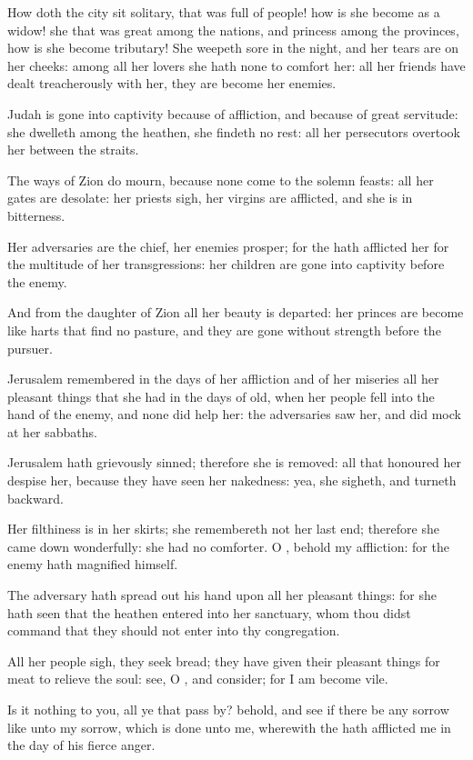 \Chapter
\Verse How doth the city sit solitary, that was full of people! how is she become as a widow! she that was great among the nations, and princess among the provinces, how is she become tributary!  \Verse She weepeth sore in the night, and her tears are on her cheeks: among all her lovers she hath none to comfort her: all her friends have dealt treacherously with her, they are become her enemies.

\Verse Judah is gone into captivity because of affliction, and because of great servitude: she dwelleth among the heathen, she findeth no rest: all her persecutors overtook her between the straits.

\Verse The ways of Zion do mourn, because none come to the solemn feasts: all her gates are desolate: her priests sigh, her virgins are afflicted, and she is in bitterness.

\Verse Her adversaries are the chief, her enemies prosper; for the \LORD hath afflicted her for the multitude of her transgressions: her children are gone into captivity before the enemy.

\Verse And from the daughter of Zion all her beauty is departed: her princes are become like harts that find no pasture, and they are gone without strength before the pursuer.

\Verse Jerusalem remembered in the days of her affliction and of her miseries all her pleasant things that she had in the days of old, when her people fell into the hand of the enemy, and none did help her: the adversaries saw her, and did mock at her sabbaths.

\Verse Jerusalem hath grievously sinned; therefore she is removed: all that honoured her despise her, because they have seen her nakedness: yea, she sigheth, and turneth backward.

\Verse Her filthiness is in her skirts; she remembereth not her last end; therefore she came down wonderfully: she had no comforter. O \LORD, behold my affliction: for the enemy hath magnified himself.

\Verse The adversary hath spread out his hand upon all her pleasant things: for she hath seen that the heathen entered into her sanctuary, whom thou didst command that they should not enter into thy congregation.

\Verse All her people sigh, they seek bread; they have given their pleasant things for meat to relieve the soul: see, O \LORD, and consider; for I am become vile.

\Verse Is it nothing to you, all ye that pass by? behold, and see if there be any sorrow like unto my sorrow, which is done unto me, wherewith the \LORD hath afflicted me in the day of his fierce anger.


